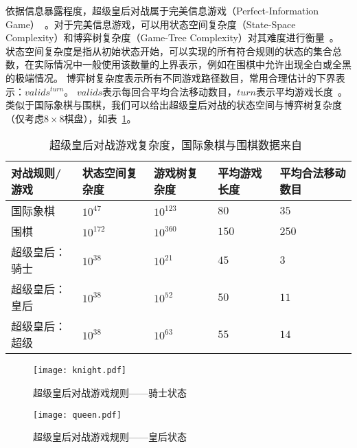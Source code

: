 依据信息暴露程度，超级皇后对战属于完美信息游戏（Perfect-Information Game）~\cite{binmore2007game}。对于完美信息游戏，可以用状态空间复杂度（State-Space Complexity）和博弈树复杂度（Game-Tree Complexity）对其难度进行衡量~\cite{allis1994searching,VANDENHERIK2002277}。
状态空间复杂度是指从初始状态开始，可以实现的所有符合规则的状态的集合总数，在实际情况中一般使用该数量的上界表示，例如在围棋中允许出现全白或全黑的极端情况。
博弈树复杂度表示所有不同游戏路径数目，常用合理估计的下界表示：$valids^{turn}$。 $valids$表示每回合平均合法移动数目，$turn$表示平均游戏长度~\cite{10.1007/BF00992697}。
类似于国际象棋与围棋，我们可以给出超级皇后对战的状态空间与博弈树复杂度（仅考虑$8\times8$棋盘），如表~\ref{table:complexity}。
\begin{table}[htb]
  \centering
  \caption[complexity]{超级皇后对战游戏复杂度，国际象棋与围棋数据来自~\cite{enwiki:complexity}}
  \begin{tabular}{p{3cm}<{\centering} p{2cm}<{\centering} p{2cm}<{\centering} p{2cm}<{\centering} p{2cm}<{\centering}}
  \hline
  对战规则/游戏 & 状态空间复杂度 & 游戏树复杂度 & 平均游戏长度 & 平均合法移动数目 \\ \hline
  国际象棋 & $10^{47}$ & $10^{123}$&$80$ &$35$\\ 
      围棋 & $10^{172}$ & $10^{360}$&$150$ &$250$ \\ 
      超级皇后：骑士 & $10^{38}$ & $10^{21}$ &$45$ & $3$\\ 
      超级皇后：皇后 & $10^{38}$ & $10^{52}$ & $50$ & $11$\\ 
      超级皇后：超级 & $10^{38}$ & $10^{63}$ & $55$ & $14$\\ \hline
  \end{tabular}
  \label{table:complexity}
\end{table}

\begin{figure}[htb]
    \centering
    \texttt{[image: knight.pdf]}
    \caption[rules-knight]{%
        超级皇后对战游戏规则——骑士状态%
      }
    \label{fig:knight}
\end{figure}

\begin{figure}[htb]
    \centering
    \texttt{[image: queen.pdf]}
    \caption[rules-queen]{%
        超级皇后对战游戏规则——皇后状态%
      }
    \label{fig:queen}
\end{figure}

